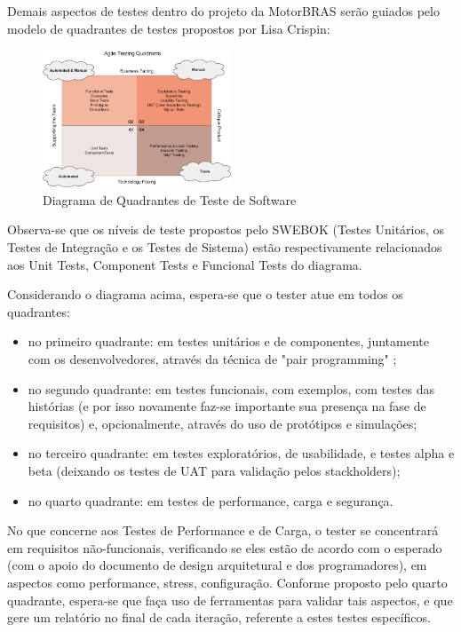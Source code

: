 \documentclass[12pt,journal,compsoc]{IEEEtran}
\begin{document}
Demais aspectos de testes dentro do projeto da MotorBRAS serão guiados pelo modelo de quadrantes de testes propostos por Lisa Crispin: \cite{agile_testing}

\begin{figure}[ht!]
\centering
\includegraphics[width=0.5\textwidth]{agile_testing_quadrants}
\caption{Diagrama de Quadrantes de Teste de Software \cite{agile_testing}}
\label{fig:agile_testing_quadrants}
\end{figure}

Observa-se que os níveis de teste propostos pelo SWEBOK \cite{society_software_2004} (Testes Unitários, os Testes de Integração e os Testes de Sistema) estão respectivamente relacionados aos Unit Tests, Component Tests e Funcional Tests do diagrama.

Considerando o diagrama acima, espera-se que o tester atue em todos os quadrantes:

\begin{itemize}
\item no primeiro quadrante: em testes unitários e de componentes, juntamente com os desenvolvedores, através da técnica de "pair programming" \cite{pairprogramming};
\item no segundo quadrante: em testes funcionais, com exemplos, com testes das histórias (e por isso novamente faz-se importante sua presença na fase de requisitos) e, opcionalmente, através do uso de protótipos e simulações;
\item no terceiro quadrante: em testes exploratórios, de usabilidade, e testes alpha e beta (deixando os testes de UAT para validação pelos stackholders);
\item no quarto quadrante: em testes de performance, carga e segurança.
\end{itemize}

No que concerne aos Testes de Performance e de Carga, o tester se concentrará em requisitos não-funcionais, verificando se eles estão de acordo com o esperado (com o apoio do documento de design arquitetural e dos programadores), em aspectos como performance, stress, configuração. Conforme proposto pelo quarto quadrante, espera-se que faça uso de ferramentas para validar tais aspectos, e que gere um relatório no final de cada iteração, referente a estes testes específicos.
\end{document}
